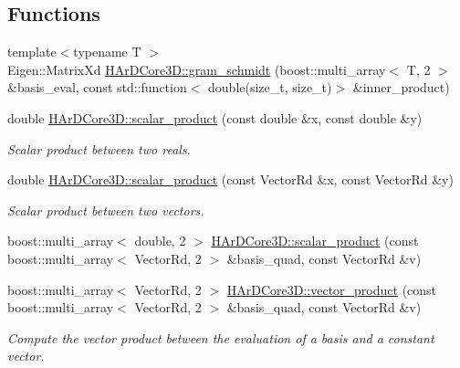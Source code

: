 \subsection*{Functions}
\begin{DoxyCompactItemize}
\item 
{\footnotesize template$<$typename T $>$ }\\Eigen\+::\+Matrix\+Xd \hyperlink{group__Basis_ga5452c71e3652aa957d105446a95826e8}{H\+Ar\+D\+Core3\+D\+::gram\+\_\+schmidt} (boost\+::multi\+\_\+array$<$ T, 2 $>$ \&basis\+\_\+eval, const std\+::function$<$ double(size\+\_\+t, size\+\_\+t)$>$ \&inner\+\_\+product)
\item 
\mbox{\label{group__Basis_ga46a7162dd1acacd29421a7d8db89c96e}} 
double \hyperlink{group__Basis_ga46a7162dd1acacd29421a7d8db89c96e}{H\+Ar\+D\+Core3\+D\+::scalar\+\_\+product} (const double \&x, const double \&y)
\begin{DoxyCompactList}\small\item\em Scalar product between two reals. \end{DoxyCompactList}\item 
\mbox{\label{group__Basis_ga0105ef2d1903eeddce62e6ad647a8ead}} 
double \hyperlink{group__Basis_ga0105ef2d1903eeddce62e6ad647a8ead}{H\+Ar\+D\+Core3\+D\+::scalar\+\_\+product} (const Vector\+Rd \&x, const Vector\+Rd \&y)
\begin{DoxyCompactList}\small\item\em Scalar product between two vectors. \end{DoxyCompactList}\item 
boost\+::multi\+\_\+array$<$ double, 2 $>$ \hyperlink{group__Basis_gaeeaa152dde6743b3293a88f14d907e7c}{H\+Ar\+D\+Core3\+D\+::scalar\+\_\+product} (const boost\+::multi\+\_\+array$<$ Vector\+Rd, 2 $>$ \&basis\+\_\+quad, const Vector\+Rd \&v)
\item 
boost\+::multi\+\_\+array$<$ Vector\+Rd, 2 $>$ \hyperlink{group__Basis_ga7fd6906b30cba10f2f452b029a86ca00}{H\+Ar\+D\+Core3\+D\+::vector\+\_\+product} (const boost\+::multi\+\_\+array$<$ Vector\+Rd, 2 $>$ \&basis\+\_\+quad, const Vector\+Rd \&v)
\begin{DoxyCompactList}\small\item\em Compute the vector product between the evaluation of a basis and a constant vector. \end{DoxyCompactList}\item 

\end{DoxyCompactItemize}
